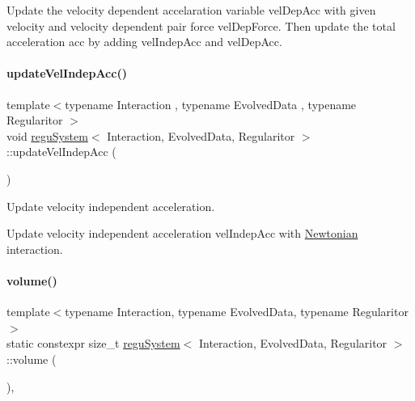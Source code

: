 Update the velocity dependent accelaration variable \textquotesingle{}vel\+Dep\+Acc\textquotesingle{} with given velocity and velocity dependent pair force \textquotesingle{}vel\+Dep\+Force\textquotesingle{}. Then update the total acceleration \textquotesingle{}acc\textquotesingle{} by adding \textquotesingle{}vel\+Indep\+Acc\textquotesingle{} and \textquotesingle{}vel\+Dep\+Acc\textquotesingle{}. \mbox{\label{classregu_system_a9ef1a5d582d3764adf3f3f35e5fac431}} 
\paragraph{\texorpdfstring{update\+Vel\+Indep\+Acc()}{updateVelIndepAcc()}}
{\footnotesize\ttfamily template$<$typename Interaction , typename Evolved\+Data , typename Regularitor $>$ \\
void \mbox{\hyperlink{classregu_system}{regu\+System}}$<$ Interaction, Evolved\+Data, Regularitor $>$\+::update\+Vel\+Indep\+Acc (\begin{DoxyParamCaption}{ }\end{DoxyParamCaption})\hspace{0.3cm}{\ttfamily [private]}}



Update velocity independent acceleration. 

Update velocity independent acceleration \textquotesingle{}vel\+Indep\+Acc\textquotesingle{} with \mbox{\hyperlink{class_newtonian}{Newtonian}} interaction. \mbox{\label{classregu_system_a4260b237d36d137b01504c0effd385fa}} 
\paragraph{\texorpdfstring{volume()}{volume()}}
{\footnotesize\ttfamily template$<$typename Interaction, typename Evolved\+Data, typename Regularitor$>$ \\
static constexpr size\+\_\+t \mbox{\hyperlink{classregu_system}{regu\+System}}$<$ Interaction, Evolved\+Data, Regularitor $>$\+::volume (\begin{DoxyParamCaption}{ }\end{DoxyParamCaption})\hspace{0.3cm}{\ttfamily [inline]}, {\ttfamily [static]}}



